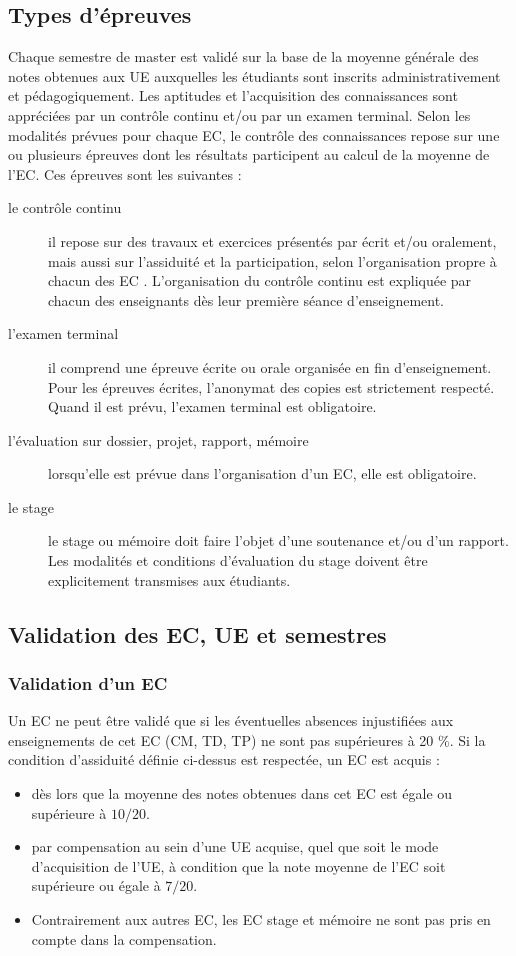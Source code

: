 \documentclass[a4paper,11pt]{article}
\begin{document}
\subsection{Types d'épreuves}
Chaque semestre de master est validé sur la base de la moyenne générale des notes obtenues aux UE auxquelles les étudiants sont inscrits administrativement et pédagogiquement.
Les aptitudes et l'acquisition des connaissances sont appréciées par un contrôle continu et/ou par un examen terminal.
Selon les modalités prévues pour chaque EC, le contrôle des connaissances repose sur une ou plusieurs épreuves dont les résultats participent au calcul de la moyenne de l'EC. Ces épreuves sont les suivantes :
\begin{description}
	\item[le contrôle continu] il repose sur des travaux et exercices présentés par écrit et/ou oralement, mais aussi sur l'assiduité et la participation, selon l'organisation propre à chacun des EC . L'organisation du contrôle continu est expliquée par chacun des enseignants dès leur première séance d'enseignement.
	\item[l'examen terminal] il comprend une épreuve écrite ou orale organisée en fin d'enseignement. Pour les épreuves écrites, l'anonymat des copies est strictement respecté. Quand il est prévu, l'examen terminal est obligatoire.
	\item[l'évaluation sur dossier, projet, rapport, mémoire] lorsqu'elle est prévue dans l'organisation d'un EC, elle est obligatoire.
	\item[le stage] le stage ou mémoire doit faire l'objet d'une soutenance et/ou d'un rapport. Les modalités et conditions d'évaluation du stage doivent être explicitement transmises aux étudiants.
\end{description}

\subsection{Validation des EC, UE et semestres}\label{Validation}
\subsubsection{Validation d'un EC}
Un EC ne peut être validé que si les éventuelles absences injustifiées aux enseignements de cet EC (CM, TD, TP) ne sont pas supérieures à 20 \%.
Si la condition d'assiduité définie ci-dessus est respectée, un EC est acquis :
\begin{itemize}
	\item dès lors que la moyenne des notes obtenues dans cet EC est égale ou supérieure à $10/20$.
	\item par compensation au sein d'une UE acquise, quel que soit le mode d'acquisition de l'UE, à condition que la note moyenne de l'EC soit supérieure ou égale à $7/20$.
	\item Contrairement aux autres EC, les EC stage et mémoire ne sont pas pris en compte dans la compensation.
\end{itemize}
\end{document}
